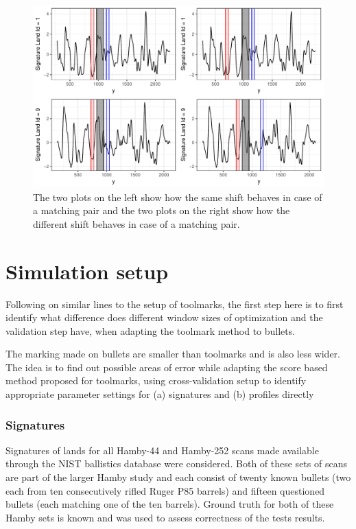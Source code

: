 \documentclass[12pt]{article}
\begin{document}
\begin{figure}

{\centering \includegraphics[width=\textwidth]{figures/win-comparison-1} 

}

\caption{ The two plots on the left show how the same shift behaves in case of a matching pair and the two plots on the right show how the different shift behaves in case of a matching pair.}\label{fig:win-comparison}
\end{figure}

\section{Simulation setup}\label{simulation-setup}

Following on similar lines to the setup of toolmarks, the first step
here is to first identify what difference does different window sizes of
optimization and the validation step have, when adapting the toolmark
method to bullets.

The marking made on bullets are smaller than toolmarks and is also less
wider. The idea is to find out possible areas of error while adapting
the score based method proposed for toolmarks, using cross-validation
setup to identify appropriate parameter settings for (a) signatures and
(b) profiles directly

\subsubsection{Signatures}\label{signatures}

Signatures of lands for all Hamby-44 and Hamby-252 scans made available
through the NIST ballistics database \citep{nist} were considered. Both
of these sets of scans are part of the larger Hamby study \citep{hamby}
and each consist of twenty known bullets (two each from ten
consecutively rifled Ruger P85 barrels) and fifteen questioned bullets
(each matching one of the ten barrels). Ground truth for both of these
Hamby sets is known and was used to assess correctness of the tests
results.
\end{document}
